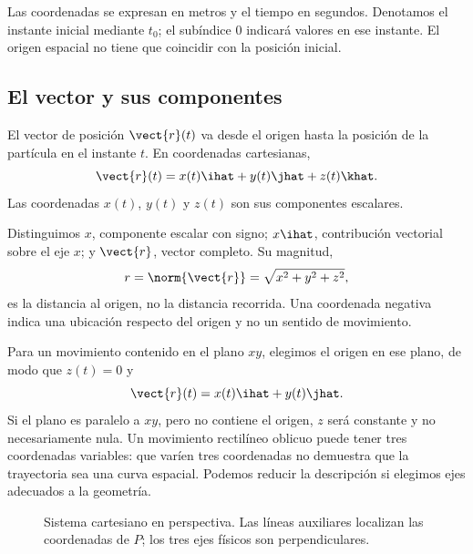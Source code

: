 Las coordenadas se expresan en metros y el tiempo en segundos. Denotamos
el instante inicial mediante \(t_0\); el subíndice \(0\) indicará valores
en ese instante. El origen espacial no tiene que coincidir con la posición inicial.

\subsection{El vector y sus componentes}

\begin{definicion}
El vector de posición \(\vect{r}(t)\) va desde el origen hasta la posición
de la partícula en el instante \(t\). En coordenadas cartesianas,
\[ \vect{r}(t)=x(t)\ihat+y(t)\jhat+z(t)\khat. \]
Las coordenadas \(x(t)\), \(y(t)\) y \(z(t)\) son sus componentes escalares.
\end{definicion}

Distinguimos \(x\), componente escalar con signo; \(x\ihat\), contribución
vectorial sobre el eje \(x\); y \(\vect{r}\), vector completo. Su magnitud,
\[ r=\norm{\vect{r}}=\sqrt{x^2+y^2+z^2}, \]
es la distancia al origen, no la distancia recorrida. Una coordenada negativa
indica una ubicación respecto del origen y no un sentido de movimiento.

Para un movimiento contenido en el plano \(xy\), elegimos el origen en ese
plano, de modo que \(z(t)=0\) y
\[ \vect{r}(t)=x(t)\ihat+y(t)\jhat. \]
Si el plano es paralelo a \(xy\), pero no contiene el origen, \(z\) será
constante y no necesariamente nula. Un movimiento rectilíneo oblicuo puede
tener tres coordenadas variables: que varíen tres coordenadas no demuestra
que la trayectoria sea una curva espacial. Podemos reducir la descripción
si elegimos ejes adecuados a la geometría.

\begin{figure}[htbp]
    \centering
    \caption{Sistema cartesiano en perspectiva. Las líneas auxiliares
    localizan las coordenadas de \(P\); los tres ejes físicos son perpendiculares.}
\end{figure}


